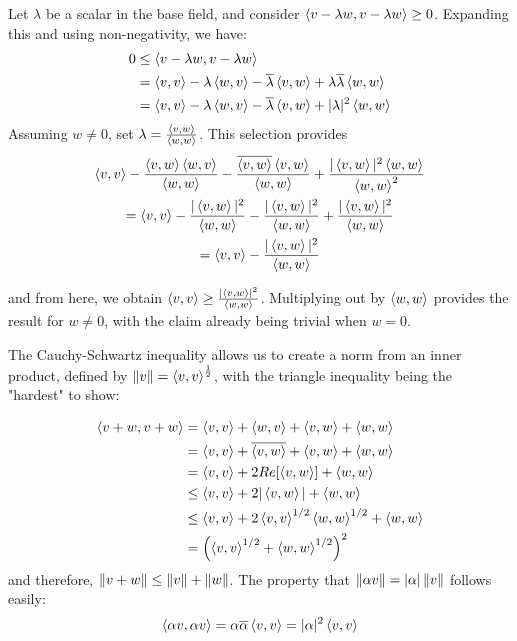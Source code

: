\begin{bproof}{}{}
Let $\lambda$ be a scalar in the base field, and consider $\ip{v - \lambda w}{v - \lambda w} \geq 0$. Expanding this and using non-negativity, we have:
\begin{equation}
\begin{split}
    0 &\leq \ip{v - \lambda w}{v - \lambda w} \\
     &= \ip{v}{v} - \lambda \ip{w}{v} - \overline{\lambda}\ip{v}{w} + \lambda \overline{\lambda} \ip{w}{w} \\
     &= \ip{v}{v} - \lambda \ip{w}{v} - \overline{\lambda}\ip{v}{w} + |\lambda|^{2} \ip{w}{w} \\
\end{split}
\end{equation}
Assuming $w \neq 0$, set $\lambda = \frac{\ip{v}{w}}{\ip{w}{w}}$. This selection provides 
\begin{equation}
    \begin{gathered}
        \ip{v}{v} - \frac{\ip{v}{w} \ip{w}{v} }{ \ip{w}{w} } - \frac{\overline{ \ip{v}{w}} \ip{v}{w}}{\ip{w}{w}} + \frac{|\ip{v}{w}|^{2} \ip{w}{w}}{\ip{w}{w}^{2}} \\
         = \ip{v}{v} - \frac{| \ip{v}{w}|^{2}}{\ip{w}{w}} - \frac{|\ip{v}{w}|^{2}}{\ip{w}{w}} + \frac{|\ip{v}{w}|^{2}}{\ip{w}{w}}\\ 
         = \ip{v}{v} - \frac{|\ip{v}{w}|^{2}}{\ip{w}{w}}
    \end{gathered}
\end{equation}

and from here, we obtain \mbox{$\ip{v}{v} \geq \frac{|\ip{v}{w}|^{2}}{\ip{w}{w}}$.} Multiplying out by $\ip{w}{w}$ provides the result for $w\neq 0$, with the claim already being trivial when $w=0$.
\eop
\end{bproof}

The Cauchy-Schwartz inequality allows us to create a norm from an inner product, defined by \mbox{$\norm{v} = \ip{v}{v}^{\frac{1}{2}}$}, with the triangle inequality being the "hardest" to show:

\begin{equation}
\begin{split}
    \ip{v+w}{v+w} &= \ip{v}{v} + \ip{w}{v} + \ip{v}{w} + \ip{w}{w} \\
     &= \ip{v}{v} + \overline{\ip{v}{w}} + \ip{v}{w} + \ip{w}{w} \\
     &= \ip{v}{v} + 2 Re[\ip{v}{w}] + \ip{w}{w} \\
     &\leq \ip{v}{v} + 2|\ip{v}{w}| + \ip{w}{w} \\
     &\leq \ip{v}{v} + 2 \ip{v}{v}^{1/2} \ip{w}{w}^{1/2} + \ip{w}{w} \\
     &= \left( \ip{v}{v}^{1/2} + \ip{w}{w}^{1/2} \right)^{2}
\end{split}
\end{equation}
and therefore, $\norm{v+w} \leq \norm{v} + \norm{w}$. The property that $\norm{\alpha v} = |\alpha| \norm{v}$ follows easily:
\begin{equation*}
    \ip{\alpha v}{\alpha v} = \alpha \overline{\alpha} \ip{v}{v} = |\alpha|^{2} \ip{v}{v}    
\end{equation*}


